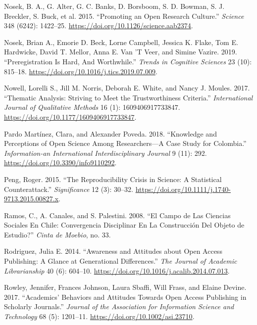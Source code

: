 \documentclass[
  english,
  letterpaper,
]{article}
\newlength{\cslhangindent}
\newenvironment{CSLReferences}[2] %
 {\begin{list}{}{%
  \setlength{\itemindent}{0pt}
  \setlength{\leftmargin}{0pt}
  \setlength{\parsep}{0pt}
  \ifodd #1
   \setlength{\leftmargin}{\cslhangindent}
   \setlength{\itemindent}{-1\cslhangindent}
  \fi
  \setlength{\itemsep}{#2\baselineskip}}}
 {\end{list}}
\begin{document}
\begin{CSLReferences}{1}{0}
Nosek, B. A., G. Alter, G. C. Banks, D. Borsboom, S. D. Bowman, S. J.
Breckler, S. Buck, et al. 2015. {``Promoting an Open Research
Culture.''} \emph{Science} 348 (6242): 1422--25.
\url{https://doi.org/10.1126/science.aab2374}.

Nosek, Brian A., Emorie D. Beck, Lorne Campbell, Jessica K. Flake, Tom
E. Hardwicke, David T. Mellor, Anna E. Van 'T Veer, and Simine Vazire.
2019. {``Preregistration {Is Hard}, {And Worthwhile}.''} \emph{Trends in
Cognitive Sciences} 23 (10): 815--18.
\url{https://doi.org/10.1016/j.tics.2019.07.009}.

Nowell, Lorelli S., Jill M. Norris, Deborah E. White, and Nancy J.
Moules. 2017. {``Thematic {Analysis}: {Striving} to {Meet} the
{Trustworthiness Criteria}.''} \emph{International Journal of
Qualitative Methods} 16 (1): 1609406917733847.
\url{https://doi.org/10.1177/1609406917733847}.

Pardo Martínez, Clara, and Alexander Poveda. 2018. {``Knowledge and
{Perceptions} of {Open Science} Among {Researchers}---{A Case Study} for
{Colombia}.''} \emph{Information-an International Interdisciplinary
Journal} 9 (11): 292. \url{https://doi.org/10.3390/info9110292}.

Peng, Roger. 2015. {``The Reproducibility Crisis in Science: {A}
Statistical Counterattack.''} \emph{Significance} 12 (3): 30--32.
\url{https://doi.org/10.1111/j.1740-9713.2015.00827.x}.

Ramos, C., A. Canales, and S. Palestini. 2008. {``El {Campo} de Las
{Ciencias Sociales} En {Chile}: {\textquestiondown}{Convergencia}
Disciplinar En La Construcci{ó}n Del Objeto de Estudio?''} \emph{Cinta
de Moebio}, no. 33.

Rodriguez, Julia E. 2014. {``Awareness and {Attitudes} about {Open
Access Publishing}: {A Glance} at {Generational Differences}.''}
\emph{The Journal of Academic Librarianship} 40 (6): 604--10.
\url{https://doi.org/10.1016/j.acalib.2014.07.013}.

Rowley, Jennifer, Frances Johnson, Laura Sbaffi, Will Frass, and Elaine
Devine. 2017. {``Academics' Behaviors and Attitudes Towards Open Access
Publishing in Scholarly Journals.''} \emph{Journal of the Association
for Information Science and Technology} 68 (5): 1201--11.
\url{https://doi.org/10.1002/asi.23710}.


\end{CSLReferences}
\end{document}
